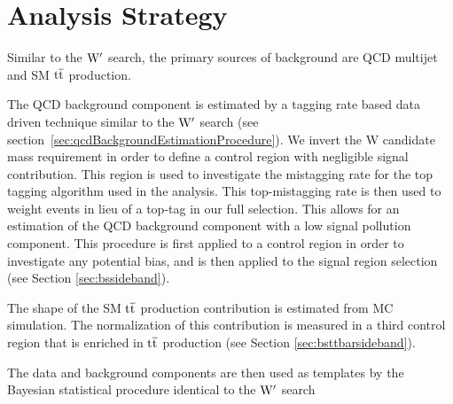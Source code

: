\chapter{Analysis Strategy}
\label{sec:bsanalysisStrategy}
Similar to the $\mathrm{W}^{\prime}$ search, the primary sources of background are QCD multijet and SM $\mathrm{t\overline{t}}$ 
production.  

The QCD background component is estimated by a tagging rate based data driven technique similar 
to the $\mathrm{W}^{\prime}$ search (see section~\ref{sec:qcdBackgroundEstimationProcedure}).  We invert the W candidate mass requirement in order to define a control region with negligible signal contribution.  
This region is used to investigate the mistagging rate for the top tagging algorithm used in the analysis.  
This top-mistagging rate is then used to weight events in lieu of a top-tag in our full selection.  This allows for an estimation of the 
QCD background component with a low signal pollution component.  This procedure is first applied to a control region in order to  
investigate any potential bias, and is then applied to the signal region selection (see Section \ref{sec:bssideband}). 

The shape of the SM $\mathrm{t\overline{t}}$ production contribution is estimated from MC simulation.  The normalization of this contribution is 
measured in a third control region that is enriched in $\mathrm{t\overline{t}}$ production (see Section \ref{sec:bsttbarsideband}).

The data and background components are then used as templates by the Bayesian statistical procedure identical to the $\mathrm{W}^{\prime}$ search
